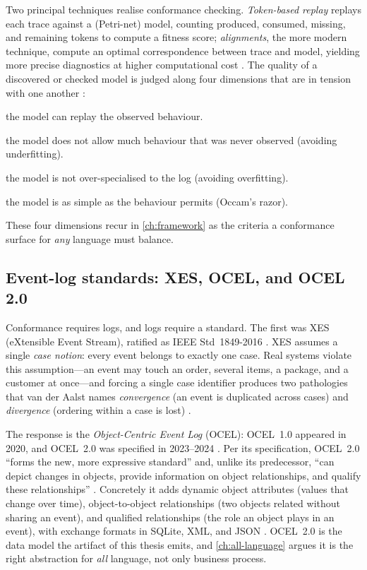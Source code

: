 Two principal techniques realise conformance checking. \emph{Token-based replay}
replays each trace against a (Petri-net) model, counting produced, consumed,
missing, and remaining tokens to compute a fitness score; \emph{alignments}, the
more modern technique, compute an optimal correspondence between trace and model,
yielding more precise diagnostics at higher computational cost
\citep{conformance-review-2020}. The quality of a discovered or checked model is
judged along four dimensions that are in tension with one another
\citep{vdaalst-book-2016}:

\begin{description}[leftmargin=1.4em,style=nextline]
  \item[Fitness] the model can replay the observed behaviour.
  \item[Precision] the model does not allow much behaviour that was never
  observed (avoiding underfitting).
  \item[Generalisation] the model is not over-specialised to the log (avoiding
  overfitting).
  \item[Simplicity] the model is as simple as the behaviour permits (Occam's
  razor).
\end{description}

These four dimensions recur in \cref{ch:framework} as the criteria a conformance
surface for \emph{any} language must balance.

\subsection{Event-log standards: XES, OCEL, and OCEL 2.0}
\label{sec:bg-ocel}

Conformance requires logs, and logs require a standard. The first was XES
(eXtensible Event Stream), ratified as IEEE Std~1849-2016 \citep{xes-2016}. XES
assumes a single \emph{case notion}: every event belongs to exactly one case.
Real systems violate this assumption---an event may touch an order, several
items, a package, and a customer at once---and forcing a single case identifier
produces two pathologies that van der Aalst names \emph{convergence} (an event is
duplicated across cases) and \emph{divergence} (ordering within a case is lost)
\citep{ocpn-2020}.

The response is the \emph{Object-Centric Event Log} (OCEL): OCEL~1.0 appeared in
2020, and OCEL~2.0 was specified in 2023--2024 \citep{ocel2-2024,ocel-standard}.
Per its specification, OCEL~2.0 ``forms the new, more expressive standard'' and,
unlike its predecessor, ``can depict changes in objects, provide information on
object relationships, and qualify these relationships'' \citep{ocel2-2024}.
Concretely it adds dynamic object attributes (values that change over time),
object-to-object relationships (two objects related without sharing an event),
and qualified relationships (the role an object plays in an event), with exchange
formats in SQLite, XML, and JSON \citep{ocel2-2024,ocel-standard}. OCEL~2.0 is
the data model the artifact of this thesis emits, and \cref{ch:all-language}
argues it is the right abstraction for \emph{all} language, not only business
process.

